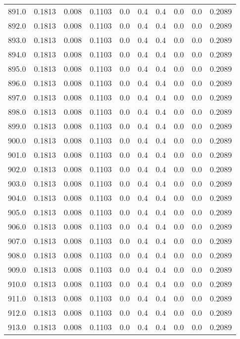 \begin{longtable}{lrrrrrrrrr}
891.0 & 0.1813 & 0.008 & 0.1103 & 0.0 & 0.4 & 0.4 & 0.0 & 0.0 & 0.2089 \\
892.0 & 0.1813 & 0.008 & 0.1103 & 0.0 & 0.4 & 0.4 & 0.0 & 0.0 & 0.2089 \\
893.0 & 0.1813 & 0.008 & 0.1103 & 0.0 & 0.4 & 0.4 & 0.0 & 0.0 & 0.2089 \\
894.0 & 0.1813 & 0.008 & 0.1103 & 0.0 & 0.4 & 0.4 & 0.0 & 0.0 & 0.2089 \\
895.0 & 0.1813 & 0.008 & 0.1103 & 0.0 & 0.4 & 0.4 & 0.0 & 0.0 & 0.2089 \\
896.0 & 0.1813 & 0.008 & 0.1103 & 0.0 & 0.4 & 0.4 & 0.0 & 0.0 & 0.2089 \\
897.0 & 0.1813 & 0.008 & 0.1103 & 0.0 & 0.4 & 0.4 & 0.0 & 0.0 & 0.2089 \\
898.0 & 0.1813 & 0.008 & 0.1103 & 0.0 & 0.4 & 0.4 & 0.0 & 0.0 & 0.2089 \\
899.0 & 0.1813 & 0.008 & 0.1103 & 0.0 & 0.4 & 0.4 & 0.0 & 0.0 & 0.2089 \\
900.0 & 0.1813 & 0.008 & 0.1103 & 0.0 & 0.4 & 0.4 & 0.0 & 0.0 & 0.2089 \\
901.0 & 0.1813 & 0.008 & 0.1103 & 0.0 & 0.4 & 0.4 & 0.0 & 0.0 & 0.2089 \\
902.0 & 0.1813 & 0.008 & 0.1103 & 0.0 & 0.4 & 0.4 & 0.0 & 0.0 & 0.2089 \\
903.0 & 0.1813 & 0.008 & 0.1103 & 0.0 & 0.4 & 0.4 & 0.0 & 0.0 & 0.2089 \\
904.0 & 0.1813 & 0.008 & 0.1103 & 0.0 & 0.4 & 0.4 & 0.0 & 0.0 & 0.2089 \\
905.0 & 0.1813 & 0.008 & 0.1103 & 0.0 & 0.4 & 0.4 & 0.0 & 0.0 & 0.2089 \\
906.0 & 0.1813 & 0.008 & 0.1103 & 0.0 & 0.4 & 0.4 & 0.0 & 0.0 & 0.2089 \\
907.0 & 0.1813 & 0.008 & 0.1103 & 0.0 & 0.4 & 0.4 & 0.0 & 0.0 & 0.2089 \\
908.0 & 0.1813 & 0.008 & 0.1103 & 0.0 & 0.4 & 0.4 & 0.0 & 0.0 & 0.2089 \\
909.0 & 0.1813 & 0.008 & 0.1103 & 0.0 & 0.4 & 0.4 & 0.0 & 0.0 & 0.2089 \\
910.0 & 0.1813 & 0.008 & 0.1103 & 0.0 & 0.4 & 0.4 & 0.0 & 0.0 & 0.2089 \\
911.0 & 0.1813 & 0.008 & 0.1103 & 0.0 & 0.4 & 0.4 & 0.0 & 0.0 & 0.2089 \\
912.0 & 0.1813 & 0.008 & 0.1103 & 0.0 & 0.4 & 0.4 & 0.0 & 0.0 & 0.2089 \\
913.0 & 0.1813 & 0.008 & 0.1103 & 0.0 & 0.4 & 0.4 & 0.0 & 0.0 & 0.2089 \\

\end{longtable}
